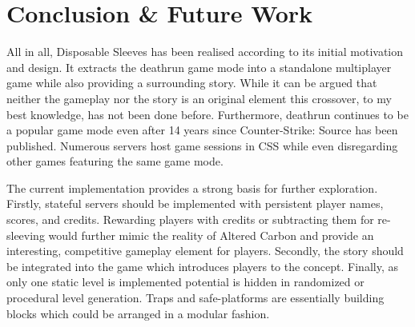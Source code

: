 \section{Conclusion \& Future Work} \label{sec:conclusion}

All in all, Disposable Sleeves has been realised according to its initial motivation and design.
It extracts the deathrun game mode into a standalone multiplayer game while also providing a surrounding story.
While it can be argued that neither the gameplay nor the story is an original element this crossover, to my best knowledge, has not been done before.
Furthermore, deathrun continues to be a popular game mode even after 14 years since Counter-Strike: Source has been published.
Numerous servers host game sessions in CSS while even disregarding other games featuring the same game mode.

The current implementation provides a strong basis for further exploration.
Firstly, stateful servers should be implemented with persistent player names, scores, and credits.
Rewarding players with credits or subtracting them for re-sleeving would further mimic the reality of Altered Carbon and provide an interesting, competitive gameplay element for players.
Secondly, the story should be integrated into the game which introduces players to the concept.
Finally, as only one static level is implemented potential is hidden in randomized or procedural level generation.
Traps and safe-platforms are essentially building blocks which could be arranged in a modular fashion.
